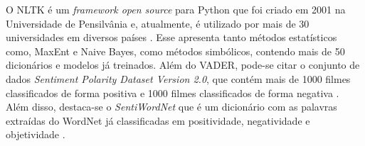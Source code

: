 O \ac{NLTK} é um \textit{framework open source} para Python que foi
criado em 2001 na Universidade de Pensilvânia e, atualmente, é utilizado por
mais de 30 universidades em diversos
países \cite{nltk}.
Esse apresenta tanto métodos estatísticos como, \ac{MaxEnt} e Naive Bayes, como
métodos simbólicos, contendo mais de 50 dicionários e modelos já treinados.
Além do \ac{VADER}, pode-se citar o conjunto de dados \textit{Sentiment
Polarity Dataset Version 2.0}, que contém mais de 1000 filmes classificados de
forma positiva e 1000 filmes classificados de forma negativa
\cite{Pang:2002:TUS:1118693.1118704}.
Além disso, destaca-se o \textit{SentiWordNet} que é um dicionário com as
palavras extraídas do WordNet já classificadas em positividade, negatividade e objetividade \cite{Esuli2006sentiwordnet}.

